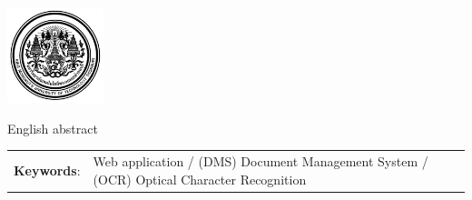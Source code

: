 \documentclass[12pt,oneside,openright,a4paper]{cpe-thai-project}
\begin{document}
\pdfstringdefDisableCommands{%
\let\MakeUppercase\relax
}

\begin{center}
  \includegraphics[width=2.8cm]{logo02.jpg}
\end{center}
\vspace*{-1cm}

\maketitlepage
\makesignaturepage 

\abstract

English abstract 

\begin{flushleft}
\begin{tabular*}{\textwidth}{@{}lp{}}
\textbf{Keywords}: & Web application / (DMS) Document Management System / (OCR) Optical Character Recognition
\end{tabular*}
\end{flushleft}
\endabstract

\thaiabstract
\end{document}
